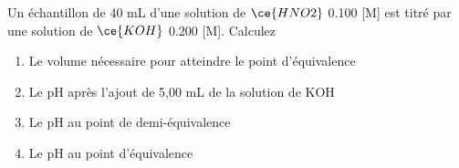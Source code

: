 \documentclass[
  11pt,
  french,
  a4paper,
  openany]{book}
\providecommand{\tightlist}{%
  \setlength{\itemsep}{0pt}\setlength{\parskip}{0pt}}
\begin{document}
\clearpage

\begin{Exercise}

Un échantillon de 40 mL d'une solution de \(\ce{HNO2}\) 0.100 {[}M{]} est titré par une solution de \(\ce{KOH}\) 0.200 {[}M{]}. Calculez

\begin{enumerate}
\def\labelenumi{\alph{enumi}.}
\tightlist
\item
  Le volume nécessaire pour atteindre le point d'équivalence
\item
  Le pH après l'ajout de 5,00 mL de la solution de KOH
\item
  Le pH au point de demi-équivalence
\item
  Le pH au point d'équivalence
\end{enumerate}


\end{Exercise}
\end{document}
